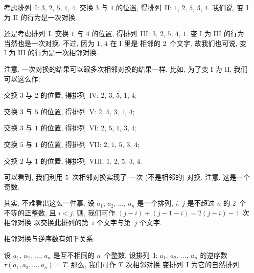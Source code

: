 \documentclass[../libro.tex]{subfiles}
\begin{document}
\begin{example}
    考虑排列~I: \(3\), \(2\), \(5\), \(1\), \(4\).
    交换 \(3\) 与 \(1\) 的位置,
    得排列~II: \(1\), \(2\), \(5\), \(3\), \(4\).
    我们说, 变 I 为 II 的行为是一次对换.

    还是考虑排列~I.
    交换 \(1\) 与 \(4\) 的位置,
    得排列~III: \(3\), \(2\), \(5\), \(4\), \(1\).
    变 I 为 III 的行为当然也是一次对换.
    不过, 因为 \(1\), \(4\) 在 I 里是%
    相邻的 \(2\)~个文字,
    故我们也可说,
    变 I 为 III 的行为是一次相邻对换.

    注意,
    一次对换的结果可以跟多次相邻对换的结果一样.
    比如, 为了变 I 为 II,
    我们可以这么作:

    交换 \(3\) 与 \(2\) 的位置,
    得排列~IV: \(2\), \(3\), \(5\), \(1\), \(4\);

    交换 \(3\) 与 \(5\) 的位置,
    得排列~V: \(2\), \(5\), \(3\), \(1\), \(4\);

    交换 \(3\) 与 \(1\) 的位置,
    得排列~VI: \(2\), \(5\), \(1\), \(3\), \(4\);

    交换 \(5\) 与 \(1\) 的位置,
    得排列~VII: \(2\), \(1\), \(5\), \(3\), \(4\);

    交换 \(2\) 与 \(1\) 的位置,
    得排列~VIII: \(1\), \(2\), \(5\), \(3\), \(4\).

    可以看到,
    我们利用 \(5\)~次相邻对换实现了%
    一次 (不是相邻的) 对换.
    注意, 这是一个奇数.

    其实, 不难看出这么一件事.
    设 \(a_1\), \(a_2\), \(\dots\), \(a_n\) 是一个排列,
    \(i\), \(j\) 是不超过 \(n\) 的 \(2\)~个不等的正整数,
    且 \(i < j\).
    则, 我们可作 \((j - i) + (j - 1 - i)
    = 2(j - i) - 1\)~次相邻对换%
    以交换此排列的第~\(i\) 个文字与第~\(j\) 个文字.
\end{example}

相邻对换与逆序数有如下关系.

\begin{theorem}
    设 \(a_1\), \(a_2\), \(\dots\), \(a_n\)
    是互不相同的 \(n\)~个整数.
    设排列~I: \(a_1\), \(a_2\), \(\dots\), \(a_n\)
    的逆序数 \(\tau (a_1, a_2, \dots, a_n) = T\).
    那么, 我们可作 \(T\)~次相邻对换%
    变排列~I 为它的自然排列.
\end{theorem}

\end{document}
